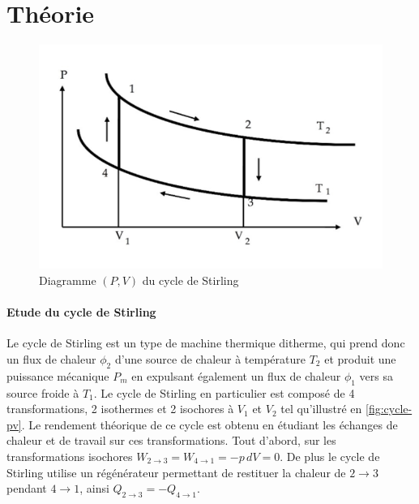 \section{Théorie}

\begin{minipage}{\linewidth}
    \begin{figure}
        \includegraphics*[width=\linewidth]{figures/cycle-stirling.png}
        \caption{Diagramme \((P,V)\) du cycle de Stirling \cite{notice}}
        \label{fig:cycle-pv}
    \end{figure}

    \paragraph*{Etude du cycle de Stirling}
    Le cycle de Stirling est un type de machine thermique ditherme, qui prend donc un flux de chaleur \(\phi_2\) d'une source de chaleur à température \(T_2\) et produit une puissance mécanique \(P_m\) en expulsant également un flux de chaleur \(\phi_1\) vers sa source froide à \(T_1\). Le cycle de Stirling en particulier est composé de 4 transformations, 2 isothermes et 2 isochores à \(V_1\) et \(V_2\) tel qu'illustré en \autoref{fig:cycle-pv}. Le rendement théorique de ce cycle est obtenu en étudiant les échanges de chaleur et de travail sur ces transformations. Tout d'abord, sur les transformations isochores \hbox{\(W_{2\to3} = W_{4\to1} = -p \, dV = 0\)}. De plus le cycle de Stirling utilise un régénérateur permettant de restituer la chaleur de \(2\to3\) pendant \(4\to1\), ainsi \(Q_{2\to3} = -Q_{4\to1}\).
\end{minipage}

